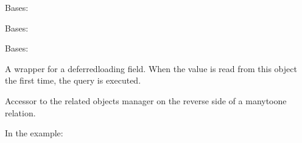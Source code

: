 \documentclass[letterpaper,10pt,spanish]{sphinxmanual}
\begin{document}
\begin{fulllineitems}

\pysigstartsignatures
{}
\pysigstopsignatures
\sphinxAtStartPar
Bases: 


\begin{fulllineitems}

\pysigstartsignatures
{}
\pysigstopsignatures
\sphinxAtStartPar
Bases: 

\end{fulllineitems}



\begin{fulllineitems}

\pysigstartsignatures
{}
\pysigstopsignatures
\sphinxAtStartPar
Bases: 

\end{fulllineitems}



\begin{fulllineitems}

\pysigstartsignatures
{}
\pysigstopsignatures
\sphinxAtStartPar
A wrapper for a deferred\sphinxhyphen{}loading field. When the value is read from this
object the first time, the query is executed.

\end{fulllineitems}



\begin{fulllineitems}

\pysigstartsignatures
{}
\pysigstopsignatures
\sphinxAtStartPar
Accessor to the related objects manager on the reverse side of a
many\sphinxhyphen{}to\sphinxhyphen{}one relation.

\sphinxAtStartPar
In the example:

\begin{sphinxVerbatim}[commandchars=\\\{\}]
 
       
\end{sphinxVerbatim}


\end{fulllineitems}
\end{fulllineitems}
\end{document}
